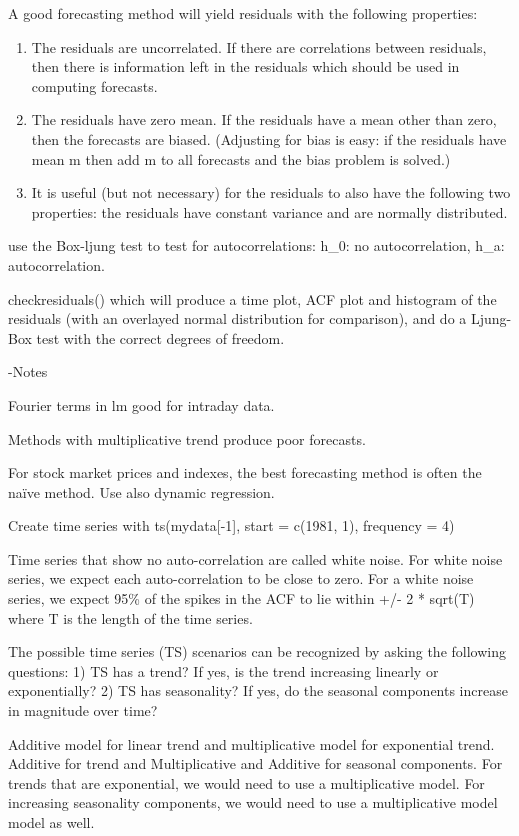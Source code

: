 \documentclass[]{book}
\begin{document}
A good forecasting method will yield residuals with the following
properties:

\begin{enumerate}
\def\labelenumi{\arabic{enumi})}
\item
  The residuals are uncorrelated. If there are correlations between
  residuals, then there is information left in the residuals which
  should be used in computing forecasts.
\item
  The residuals have zero mean. If the residuals have a mean other than
  zero, then the forecasts are biased. (Adjusting for bias is easy: if
  the residuals have mean m then add m to all forecasts and the bias
  problem is solved.)
\item
  It is useful (but not necessary) for the residuals to also have the
  following two properties: the residuals have constant variance and are
  normally distributed.
\end{enumerate}

use the Box-ljung test to test for autocorrelations: h\_0: no
autocorrelation, h\_a: autocorrelation.

checkresiduals() which will produce a time plot, ACF plot and histogram
of the residuals (with an overlayed normal distribution for comparison),
and do a Ljung-Box test with the correct degrees of freedom.

-Notes

Fourier terms in lm good for intraday data.

Methods with multiplicative trend produce poor forecasts.

For stock market prices and indexes, the best forecasting method is
often the naïve method. Use also dynamic regression.

Create time series with ts(mydata{[}-1{]}, start = c(1981, 1), frequency
= 4)

Time series that show no auto-correlation are called white noise. For
white noise series, we expect each auto-correlation to be close to zero.
For a white noise series, we expect 95\% of the spikes in the ACF to lie
within +/- 2 * sqrt(T) where T is the length of the time series.

The possible time series (TS) scenarios can be recognized by asking the
following questions: 1) TS has a trend? If yes, is the trend increasing
linearly or exponentially? 2) TS has seasonality? If yes, do the
seasonal components increase in magnitude over time?

Additive model for linear trend and multiplicative model for exponential
trend. Additive for trend and Multiplicative and Additive for seasonal
components. For trends that are exponential, we would need to use a
multiplicative model. For increasing seasonality components, we would
need to use a multiplicative model model as well.
\end{document}
